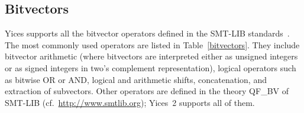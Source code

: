 \documentclass[11pt,twoside,fleqn,openright,titlepage]{cslreport}
\begin{document}
\subsection{Bitvectors}
\label{bitvector-general}

Yices supports all the bitvector operators defined in the SMT-LIB
standards~\cite{SMTLIB12:2006,SMTLIB20:2012,SMTLIB25:2015}.  The most
commonly used operators are listed in Table~\ref{bitvectors}.  They
include bitvector arithmetic (where bitvectors are interpreted either
as unsigned integers or as signed integers in two's complement
representation), logical operators such as bitwise OR or AND, logical
and arithmetic shifts, concatenation, and extraction of
subvectors. Other operators are defined in the theory QF\_BV of
SMT-LIB (cf.~\url{http://www.smtlib.org}); Yices~2 supports all of
them.
\end{document}
